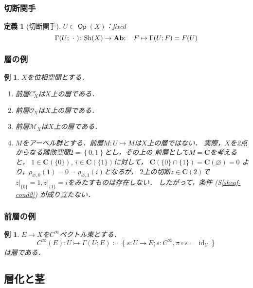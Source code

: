 \documentclass[dvipdfmx,12pt,aspectratio=169,leqno]{beamer}%
\newcommand{\cc}{\mathbf{C}}
\newcommand{\Ab}{{\bf Ab}}
\numberwithin{equation}{subsection}
\newcommand{\Op}{\mathop{\textsf{Op}}\nolimits}
\newcommand{\id}{\mathop{\mathrm{id}}\nolimits}
\newcommand{\Sh}{\mathrm{Sh}}
\newcommand{\blk}{\mathord{\ \cdot\ }}
\theoremstyle{mystyle}
\newtheorem{DFN}[AXM]{定義}
\newtheorem{EG}[AXM]{例}
\begin{document}
\begin{frame}
    \frametitle{切断関手}

    \begin{DFN}[切断関手]
        \(U\in\Op(X)\)：fixed
        \[
            \Gamma(U;\blk)\colon \Sh(X)\to \Ab;\quad F\mapsto
            \Gamma(U;F)=F(U)
        \]
    \end{DFN}    
\end{frame}



\begin{frame}
    \frametitle{層の例}
    \begin{EG}\label{eg:sheaf}
        \(X\)を位相空間とする．
        \begin{enumerate}
            \item 前層\(C_X^r\)は\(X\)上の層である．
            \item 前層\(\mathscr{O}_X\)は\(X\)上の層である．
            \item 前層\(\mathscr{M}_X\)は\(X\)上の層である．
            \item \(M\)をアーベル群とする．前層\(M\colon U\mapsto M\)は\(X\)上の層ではない．
            実際，\(X\)を2点からなる離散空間\(2=\left\{0,1\right\}\)とし，その上の
            前層として\(M=\cc\)を考えると，
            \(1\in\cc(\{0\})\), \(i\in\cc(\{1\})\)に対して，
            \(\cc(\{0\}\cap\{1\})=\cc(\varnothing)=0\)
            より，\(\rho_{\varnothing,{0}}(1)=0
            =\rho_{\varnothing,{1}}(i)\)となるが，
            \(2\)上の切断\(z\in\cc(2)\)で\(z\rvert_{\{0\}}=1,
            z\rvert_{\{1\}}=i\)をみたすものは存在しない．
            したがって，条件 (S\ref{sheaf-cond2}) が成り立たない．\label{eg:non-sheaf}
        \end{enumerate}
    \end{EG}    
\end{frame}

\begin{frame}
    \frametitle{前層の例}
    \begin{EG}
        \(E\to X\)を\(C^{\infty}\)ベクトル束とする．
        \[
            C^{\infty}(E)\colon U\mapsto \Gamma(U;E)\coloneqq
            \left\{s\colon U\to E;s\colon C^{\infty}, \pi\circ s=\id_U\right\}
        \]は層である．
    \end{EG}
\end{frame}


\subsection{層化と茎}
\end{document}
